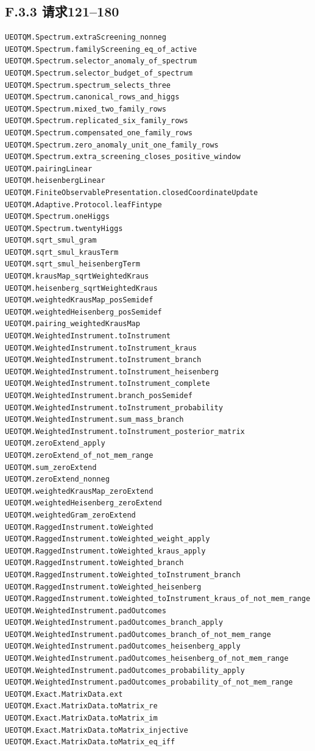 \documentclass[
  11pt,
  oneside]{book}
\begin{document}
\subsection{F.3.3 请求121--180}

\begin{Verbatim}[breaklines,breakanywhere,fontsize=\scriptsize]
UEOTQM.Spectrum.extraScreening_nonneg
UEOTQM.Spectrum.familyScreening_eq_of_active
UEOTQM.Spectrum.selector_anomaly_of_spectrum
UEOTQM.Spectrum.selector_budget_of_spectrum
UEOTQM.Spectrum.spectrum_selects_three
UEOTQM.Spectrum.canonical_rows_and_higgs
UEOTQM.Spectrum.mixed_two_family_rows
UEOTQM.Spectrum.replicated_six_family_rows
UEOTQM.Spectrum.compensated_one_family_rows
UEOTQM.Spectrum.zero_anomaly_unit_one_family_rows
UEOTQM.Spectrum.extra_screening_closes_positive_window
UEOTQM.pairingLinear
UEOTQM.heisenbergLinear
UEOTQM.FiniteObservablePresentation.closedCoordinateUpdate
UEOTQM.Adaptive.Protocol.leafFintype
UEOTQM.Spectrum.oneHiggs
UEOTQM.Spectrum.twentyHiggs
UEOTQM.sqrt_smul_gram
UEOTQM.sqrt_smul_krausTerm
UEOTQM.sqrt_smul_heisenbergTerm
UEOTQM.krausMap_sqrtWeightedKraus
UEOTQM.heisenberg_sqrtWeightedKraus
UEOTQM.weightedKrausMap_posSemidef
UEOTQM.weightedHeisenberg_posSemidef
UEOTQM.pairing_weightedKrausMap
UEOTQM.WeightedInstrument.toInstrument
UEOTQM.WeightedInstrument.toInstrument_kraus
UEOTQM.WeightedInstrument.toInstrument_branch
UEOTQM.WeightedInstrument.toInstrument_heisenberg
UEOTQM.WeightedInstrument.toInstrument_complete
UEOTQM.WeightedInstrument.branch_posSemidef
UEOTQM.WeightedInstrument.toInstrument_probability
UEOTQM.WeightedInstrument.sum_mass_branch
UEOTQM.WeightedInstrument.toInstrument_posterior_matrix
UEOTQM.zeroExtend_apply
UEOTQM.zeroExtend_of_not_mem_range
UEOTQM.sum_zeroExtend
UEOTQM.zeroExtend_nonneg
UEOTQM.weightedKrausMap_zeroExtend
UEOTQM.weightedHeisenberg_zeroExtend
UEOTQM.weightedGram_zeroExtend
UEOTQM.RaggedInstrument.toWeighted
UEOTQM.RaggedInstrument.toWeighted_weight_apply
UEOTQM.RaggedInstrument.toWeighted_kraus_apply
UEOTQM.RaggedInstrument.toWeighted_branch
UEOTQM.RaggedInstrument.toWeighted_toInstrument_branch
UEOTQM.RaggedInstrument.toWeighted_heisenberg
UEOTQM.RaggedInstrument.toWeighted_toInstrument_kraus_of_not_mem_range
UEOTQM.WeightedInstrument.padOutcomes
UEOTQM.WeightedInstrument.padOutcomes_branch_apply
UEOTQM.WeightedInstrument.padOutcomes_branch_of_not_mem_range
UEOTQM.WeightedInstrument.padOutcomes_heisenberg_apply
UEOTQM.WeightedInstrument.padOutcomes_heisenberg_of_not_mem_range
UEOTQM.WeightedInstrument.padOutcomes_probability_apply
UEOTQM.WeightedInstrument.padOutcomes_probability_of_not_mem_range
UEOTQM.Exact.MatrixData.ext
UEOTQM.Exact.MatrixData.toMatrix_re
UEOTQM.Exact.MatrixData.toMatrix_im
UEOTQM.Exact.MatrixData.toMatrix_injective
UEOTQM.Exact.MatrixData.toMatrix_eq_iff
\end{Verbatim}
\end{document}
